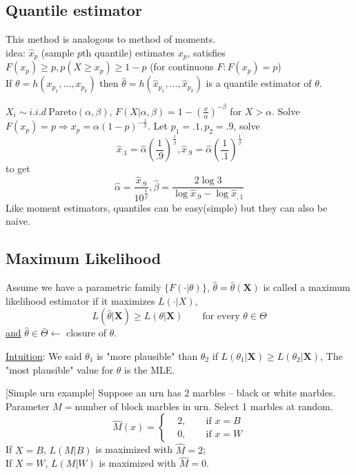 \documentclass[english, 11pt]{article}
\begin{document}
\subsection{Quantile estimator}
This method is analogous to method of moments. \\
idea: $\hat{x}_p$ (sample $p$th quantile) estimates $x_p$, satisfies $F(x_p)\geqslant p, p(X\geqslant x_p)\geqslant 1-p$ (for continuous $F:F(x_p)=p$)\\
If $\theta=h(x_{p_1}, \dots, x_{p_k})$ then $\hat{\theta}=h(\hat{x}_{p_1}, \dots, \hat{x}_{p_k})$ is a quantile estimator of $\theta$.

\begin{exmp}\label{exmp:312}
$X_i\sim i.i.d~\text{Pareto}(\alpha, \beta)$, $F(X|\alpha, \beta)=1-\left(\frac{x}{\alpha}\right)^{-\beta}$ for $X>\alpha$. Solve $F(x_p)=p\Rightarrow x_p=\alpha(1-p)^{-\frac{1}{\beta}}$. Let $p_1=.1, p_2=.9$, solve 
$$
\hat{x}_{.1}=\hat{\alpha}\left(\frac{1}{.9}\right)^{\frac{1}{\hat{\beta}}}, \hat{x}_{.9}=\hat{\alpha}\left(\frac{1}{.1}\right)^{\frac{1}{\hat{\beta}}}
$$
to get 
$$
\hat{\alpha}=\frac{\hat{x}_{.9}}{10^{\frac{1}{\hat{\beta}}}}, \hat{\beta}=\frac{2\log 3}{\log \hat{x}_{.9}-\log\hat{x}_{,1}}
$$
Like moment estimators, quantiles can be easy(simple) but they can also be naive.
\end{exmp}

\subsection{Maximum Likelihood}
Assume we have a parametric family $\{F(\cdot|\theta)\}$, $\hat{\theta}=\hat{\theta}(\bm{X})$ is called a maximum likelihood estimator if it maximizes $L(\cdot|X)$, 
$$
L(\hat{\theta}|\bm{X})\geqslant L(\theta|\bm{X})\qquad \text{for every } \theta\in \Theta
$$
\underline{and} $\hat{\theta}\in\bar{\Theta}\leftarrow$ closure of $\theta$.


\underline{Intuition}: We said $\theta_1$ is "more plausible" than $\theta_2$ if $L(\theta_1|\bm{X})\geqslant L(\theta_2|\bm{X})$, The "most plausible" value for $\theta$ is the MLE.


\begin{exmp}\label{exmp:314}[Simple urn example]
Suppose an urn has 2 marbles -- black or white marbles. Parameter $M=$number of block marbles in urn. Select 1 marbles at random.
$$
\hat{M}(x)=\left\{\begin{aligned}&2,\qquad \text{if }x=B\\
&0,\qquad \text{if }x=W
\end{aligned}\right.
$$
If $X=B$, $L(M|B)$ is maximized with $\hat{M}=2$;\\
If $X=W$, $L(M|W)$ is maximized with $\hat{M}=0$.
\end{exmp}
\end{document}
